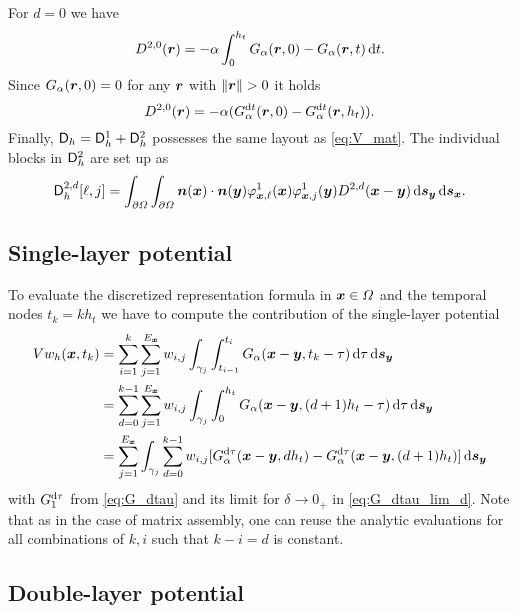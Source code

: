 \documentclass[a4paper,11pt]{article}
\begin{document}
For $d=0$ we have
\begin{equation*}
  D^{2,0}({{\bm{r}}}) = -\alpha \int_0^{h_t} G_\alpha({{\bm{r}}},0) - G_\alpha({{\bm{r}}}, t) \,{\mathrm{d}} t.
\end{equation*}
Since $G_\alpha({{\bm{r}}},0) = 0$ for any ${{\bm{r}}}$ with $\| \vr\|>0$ it holds
\begin{equation*}
  D^{2,0}({{\bm{r}}}) = -\alpha ( G_\alpha^{{\mathrm{d}} t}( {{\bm{r}}}, 0 ) - G_\alpha^{{\mathrm{d}} t}({{\bm{r}}}, h_t ) ).
\end{equation*}
Finally, ${{\mathsf{D}}}_h = {{\mathsf{D}}}_h^1 + {{\mathsf{D}}}_h^2$ possesses the same layout as \eqref{eq:V_mat}. The individual blocks in ${{\mathsf{D}}}_h^2$ are set up as
\begin{equation*}
  {\ensuremath{{\mathsf{D}}}}^{2,d}_h[ \ell , j ] = \int_{\partial\Omega} \int_{\partial\Omega} {{\bm{n}}}({{\bm{x}}}) \cdot {\ensuremath{{\bm{n}}}}({{\bm{y}}}) \varphi^1_{{{\bm{x}}},\ell}({{\bm{x}}}) \varphi^1_{{{\bm{x}}},j}({{\bm{y}}}) D^{2,d}({{\bm{x}}}-{{\bm{y}}}) \,{\mathrm{d}}{{\bm{s}}}_{{\bm{y}}} \,{\mathrm{d}}{{\bm{s}}}_{{\bm{x}}}.
\end{equation*}

\subsection{Single-layer potential}

To evaluate the discretized representation formula in ${{\bm{x}}}\in\Omega$ and the temporal nodes $t_k = k h_t$ we have to compute the contribution of the single-layer potential
\begin{align*}
 Vw_h({{\bm{x}}}, t_k) &= \sum_{i=1}^{k} \sum_{j=1}^{E_{{\bm{x}}}} w_{i,j} \int_{\gamma_j} \int_{t_{i-1}}^{t_i} G_\alpha({{\bm{x}}}-{{\bm{y}}},t_k-\tau) \,{\mathrm{d}}\tau \,{\mathrm{d}}{{\bm{s}}}_{{\bm{y}}} \\
 &= \sum_{d=0}^{k-1} \sum_{j=1}^{E_{{\bm{x}}}} w_{i,j} \int_{\gamma_j} \int_{0}^{h_t} G_\alpha({{\bm{x}}}-{{\bm{y}}},(d+1)h_t-\tau) \,{\mathrm{d}}\tau \,{\mathrm{d}}{{\bm{s}}}_{{\bm{y}}} \\
  &= \sum_{j=1}^{E_{{\bm{x}}}} \int_{\gamma_j} \sum_{d=0}^{k-1} w_{i,j} [ G_\alpha^{{\mathrm{d}}\tau}({{\bm{x}}}-{{\bm{y}}}, dh_t) - G_\alpha^{{\mathrm{d}}\tau}({{\bm{x}}}-{{\bm{y}}}, (d+1)h_t) ] \,{\mathrm{d}}{{\bm{s}}}_{{\bm{y}}}
\end{align*}
with $G_1^{{\mathrm{d}}\tau}$ from \eqref{eq:G_dtau} and its limit for $\delta \to 0_+$ in \eqref{eq:G_dtau_lim_d}. Note that as in the case of matrix assembly, one can reuse the analytic evaluations for all combinations of $k,i$ such that $k-i=d$ is constant.

\subsection{Double-layer potential}
\end{document}
